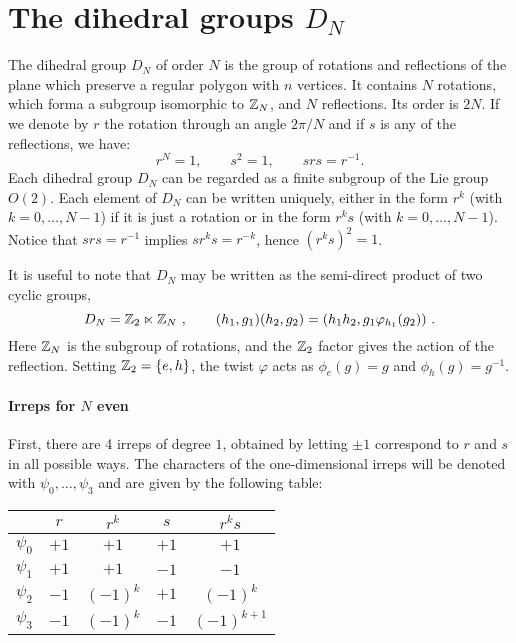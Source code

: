 %
%
\section{The dihedral groups \texorpdfstring{$D_N$}{DN}}
\label{app:the_dihedral_groups}


The dihedral group $D_N$ of order $N$ is the group of rotations and reflections of the plane which preserve a regular polygon with $n$ vertices.
It contains $N$ rotations, which forma a subgroup isomorphic to $\mathbb{Z}_N$, and $N$ reflections.
Its order is $2N$.
If we denote by $r$ the rotation through an angle $2 \pi / N$ and if $s$ is any of the reflections, we have:
\begin{equation}
    r^N = 1, \qquad s^2 = 1, \qquad srs = r^{-1}.
\end{equation}
Each dihedral group $D_N$ can be regarded as a finite subgroup of the Lie group $O(2)$.
Each element of $D_N$ can be written uniquely, either in the form $r^k$ (with $k=0, \dots, N-1$) if it is just a rotation or in the form $r^k s$ (with $k = 0, \dots, N-1$).
Notice that $srs = r^{-1}$ implies $s r^k s = r^{-k}$, hence $(r^k s)^2 = 1$.

It is useful to note that $D_N$ may be written as the semi-direct product of two cyclic groups,
\begin{equation}
    \label{eq:semidirect product}
    D_N = \mathbb{Z}_2 \ltimes \mathbb{Z}_N \ , \quad \quad (h_1,g_1) (h_2,g_2) = (h_1h_2, g_1\varphi_{h_1}(g_2)) \ .
\end{equation}
Here $\mathbb{Z}_N$ is the subgroup of rotations, and the $\mathbb{Z}_2$ factor gives the action of the reflection.
Setting $\mathbb{Z}_2 = \{e, h\}$, the twist $\varphi$ acts as $\phi_e(g)=g$ and $\phi_h(g)=g^{-1}$.


\paragraph*{Irreps for $N$ even}

First, there are 4 irreps of degree $1$, obtained by letting $\pm 1$ correspond to $r$ and $s$ in all possible ways.
The characters of the one-dimensional irreps will be denoted with $\psi_0, \dots, \psi_3$ and are given by the following table:

\begin{center}
    \begin{tabular}{ccccc}
        \toprule
               & $r$ & $r^k$ & $s$ & $r^k s$ \\
        \midrule
        $\psi_0$ & $+1$ & $+1$     & $+1$ & $+1$         \\
        $\psi_1$ & $+1$ & $+1$     & $-1$ & $-1$         \\
        $\psi_2$ & $-1$ & $(-1)^k$ & $+1$ & $(-1)^k$     \\
        $\psi_3$ & $-1$ & $(-1)^k$ & $-1$ & $(-1)^{k+1}$ \\
        \bottomrule
    \end{tabular}
\end{center}

